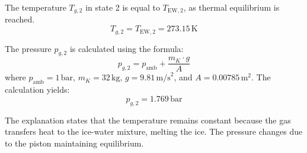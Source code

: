 The temperature \( T_{g,2} \) in state 2 is equal to \( T_{\text{EW},2} \), as thermal equilibrium is reached.  
\[
T_{g,2} = T_{\text{EW},2} = 273.15 \, \text{K}
\]  

The pressure \( p_{g,2} \) is calculated using the formula:  
\[
p_{g,2} = p_{\text{amb}} + \frac{m_K \cdot g}{A}
\]  
where \( p_{\text{amb}} = 1 \, \text{bar} \), \( m_K = 32 \, \text{kg} \), \( g = 9.81 \, \text{m/s}^2 \), and \( A = 0.00785 \, \text{m}^2 \).  
The calculation yields:  
\[
p_{g,2} = 1.769 \, \text{bar}
\]  

The explanation states that the temperature remains constant because the gas transfers heat to the ice-water mixture, melting the ice. The pressure changes due to the piston maintaining equilibrium.